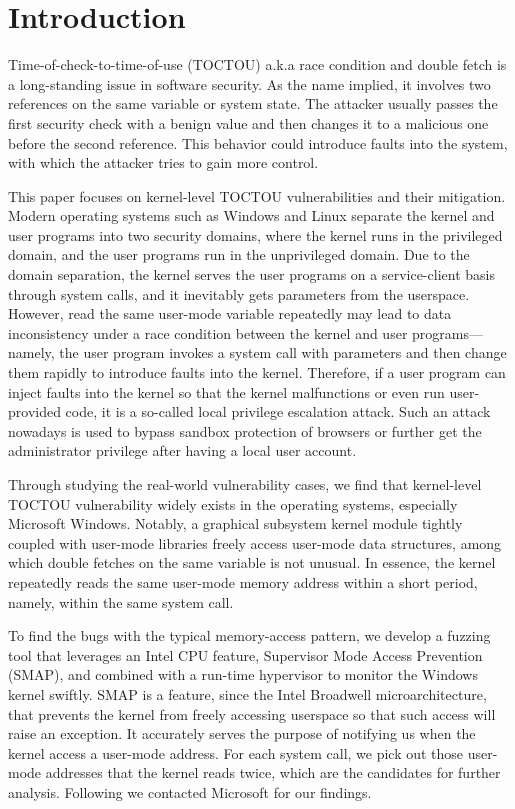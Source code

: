 
\section{Introduction}
\label{sec:ktoctou-introduction}


Time-of-check-to-time-of-use (TOCTOU) a.k.a race condition and double fetch is a long-standing issue in software security. As the name implied, it involves two references on the same variable or system state. The attacker usually passes the first security check with a benign value and then changes it to a malicious one before the second reference. This behavior could introduce faults into the system, with which the attacker tries to gain more control.

This paper focuses on kernel-level TOCTOU vulnerabilities and their mitigation. Modern operating systems such as Windows and Linux separate the kernel and user programs into two security domains,  where the kernel runs in the privileged domain, and the user programs run in the unprivileged domain. Due to the domain separation, the kernel serves the user programs on a service-client basis through system calls, and it inevitably gets parameters from the userspace. However, read the same user-mode variable repeatedly may lead to data inconsistency under a race condition between the kernel and user programs---namely, the user program invokes a system call with parameters and then change them rapidly to introduce faults into the kernel. Therefore, if a user program can inject faults into the kernel so that the kernel malfunctions or even run user-provided code, it is a so-called local privilege escalation attack. Such an attack nowadays is used to bypass sandbox protection of browsers or further get the administrator privilege after having a local user account.

Through studying the real-world vulnerability cases,  we find that kernel-level TOCTOU vulnerability widely exists in the operating systems, especially Microsoft Windows. Notably, a graphical subsystem kernel module tightly coupled with user-mode libraries freely access user-mode data structures, among which double fetches on the same variable is not unusual. In essence, the kernel repeatedly reads the same user-mode memory address within a short period, namely, within the same system call. 

To find the bugs with the typical memory-access pattern, we develop a fuzzing tool that leverages an Intel CPU feature, Supervisor Mode Access Prevention (SMAP), and combined with a run-time hypervisor to monitor the Windows kernel swiftly. SMAP is a feature, since the Intel Broadwell microarchitecture, that prevents the kernel from freely accessing userspace so that such access will raise an exception. It accurately serves the purpose of notifying us when the kernel access a user-mode address. For each system call, we pick out those user-mode addresses that the kernel reads twice, which are the candidates for further analysis. Following we contacted Microsoft for our findings.

